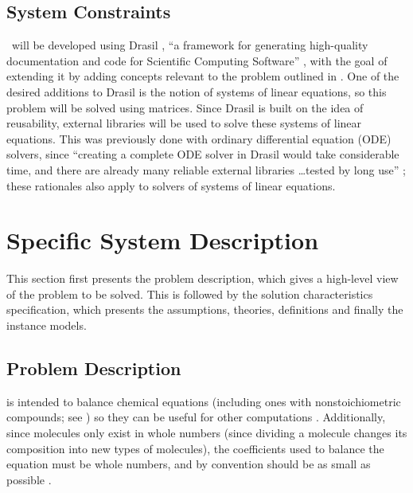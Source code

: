 \documentclass[12pt]{article}
\begin{document}
\subsection{System Constraints} \label{sec_sysConst}


\progname~will be developed using Drasil \cite{carette_drasil_2021}, ``a
framework for generating high-quality documentation and code for Scientific
Computing Software'' \cite[p. iii]{maclachlan_design_2020}, with the goal of
extending it by adding concepts relevant to the problem outlined in
. One of the desired additions to Drasil is the notion of
systems of linear equations, so this problem will be solved using matrices.
Since Drasil is built on the idea of reusability, external libraries will be
used to solve these systems of linear equations. This was previously done with
ordinary differential equation (ODE) solvers, since ``creating a complete ODE
solver in Drasil would take considerable time, and there are already many
reliable external libraries \dots tested by long use''
\cite[p. 24]{chen_solving_2022}; these rationales also apply to solvers of
systems of linear equations.

\section{Specific System Description} \label{sec_specSysDesc}

This section first presents the problem description, which gives a high-level
view of the problem to be solved.  This is followed by the solution characteristics
specification, which presents the assumptions, theories, definitions and finally
the instance models.

\subsection{Problem Description} \label{sec_probDesc}

\progname{} is intended to balance chemical equations (including ones with
nonstoichiometric compounds; see ) so
they can be useful for other computations \cite{lund_introduction_2023}.
Additionally, since molecules only exist in whole numbers (since dividing a
molecule changes its composition into new types of molecules), the coefficients
used to balance the equation must be whole
numbers, and by convention should be as small as possible
\cite{lund_introduction_2023}.
\end{document}
